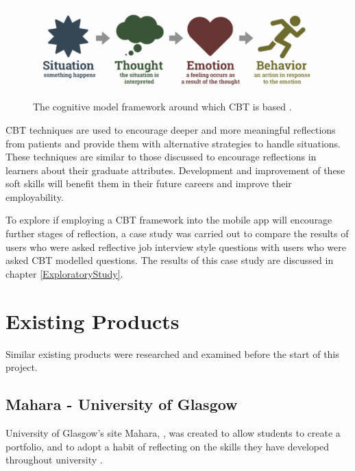 \documentclass{l4proj}
\begin{document}
\begin{figure}[h!]
    \begin{centering}
    \includegraphics[scale=0.5]{images/cognitive-model.png}
    \caption{The cognitive model framework around which CBT is based \citep{therapist_aid_psychoeducation}.}
    \label{fig: CognitiveModel}
    \end{centering}
\end{figure}

CBT techniques are used to encourage deeper and more meaningful reflections from patients and provide them with alternative strategies to handle situations. These techniques are similar to those discussed to encourage reflections in learners about their graduate attributes. Development and improvement of these soft skills will benefit them in their future careers and improve their employability.

To explore if employing a CBT framework into the mobile app will encourage further stages of reflection, a case study was carried out to compare the results of users who were asked reflective job interview style questions with users who were asked CBT modelled questions. The results of this case study are discussed in chapter \ref{ExploratoryStudy}.

\section{Existing Products}

Similar existing products were researched and examined before the start of this project.

\subsection{Mahara - University of Glasgow}

University of Glasgow's site Mahara, \citep{mahara_dashboard}, was created to allow students to create a portfolio, and to adopt a habit of reflecting on the skills they have developed throughout university \citep{glasgow_university_attributes}.
\end{document}
